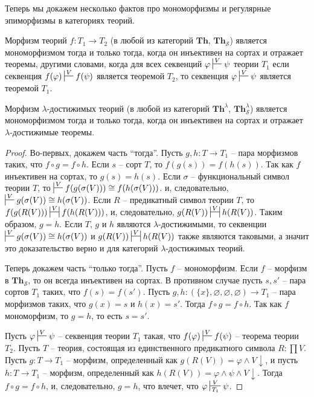 \documentclass[reqno]{amsart}
\theoremstyle{definition}
\theoremstyle{remark}
\newcommand{\bcat}[1]{\mathbf{#1}}
\newcommand{\Th}{\bcat{Th}}
\begin{document}
Теперь мы докажем несколько фактов про мономорфизмы и регулярные эпиморфизмы в категориях теорий.

\begin{prop}[th-mono]
Морфизм теорий $f : T_1 \to T_2$ (в любой из категорий $\Th$, $\Th_\mathcal{S}$) является мономорфизмом тогда и только тогда,
когда он инъективен на сортах и отражает теоремы, другими словами, когда для всех секвенций $\varphi \sststile{}{V} \psi$ теории $T_1$
если секвенция $f(\varphi) \sststile{}{V} f(\psi)$ является теоремой $T_2$, то секвенция $\varphi \sststile{}{V} \psi$ является теоремой $T_1$.

Морфизм $\lambda$-достижимых теорий (в любой из категорий $\Th^\lambda$, $\Th_\mathcal{S}^\lambda$) является мономорфизмом тогда и только тогда, когда он инъективен на сортах и отражает $\lambda$-достижимые теоремы.
\end{prop}
\begin{proof}
Во-первых, докажем часть ``тогда''.
Пусть $g,h : T \to T_1$ -- пара морфизмов таких, что $f \circ g = f \circ h$.
Если $s$ -- сорт $T$, то $f(g(s)) = f(h(s))$.
Так как $f$ инъективен на сортах, то $g(s) = h(s)$.
Если $\sigma$ -- функциональный символ теории $T$, то $\sststile{}{V} f(g(\sigma(V))) \cong f(h(\sigma(V)))$. и, следовательно, $\sststile{}{V} g(\sigma(V)) \cong h(\sigma(V))$.
Если $R$ -- предикатный символ теории $T$, то $f(g(R(V))) \ssststile{}{V} f(h(R(V)))$, и, следовательно, $g(R(V)) \ssststile{}{V} h(R(V))$.
Таким образом, $g = h$.
Если $T$, $g$ и $h$ являются $\lambda$-достижимыми, то секвенции $\sststile{}{V} g(\sigma(V)) \cong h(\sigma(V))$ и $g(R(V)) \ssststile{}{V} h(R(V))$ также являются таковыми, а значит это доказательство верно и для категорий $\lambda$-достижимых теорий.

Теперь докажем часть ``только тогда''.
Пусть $f$ -- мономорфизм.
Если $f$ -- морфизм в $\Th_\mathcal{S}$, то он всегда инъективен на сортах.
В противном случае пусть $s,s'$ -- пара сортов $T_1$ таких, что $f(s) = f(s')$.
Пусть $g,h : (\{x\},\varnothing,\varnothing,\varnothing) \to T_1$ -- пара морфизмов таких, что $g(x) = s$ и $h(x) = s'$.
Тогда $f \circ g = f \circ h$.
Так как $f$ мономорфизм, то $g = h$, то есть $s = s'$.

Пусть $\varphi \sststile{}{V} \psi$ -- секвенция теории $T_1$ такая, что $f(\varphi) \sststile{}{V} f(\psi)$ -- теорема теории $T_2$.
Пусть $T$ -- теория, состоящая из единственного предикатного символа $R : \prod V$.
Пусть $g : T \to T_1$ -- морфизм, определенный как $g(R(V)) = \varphi \land V\!\downarrow$, и пусть $h : T \to T_1$ -- морфизм, определенный как $h(R(V)) = \varphi \land \psi \land V\!\downarrow$.
Тогда $f \circ g = f \circ h$, и, следовательно, $g = h$, что влечет, что $\varphi \sststile{T_1}{V} \psi$.
\end{proof}
\end{document}
